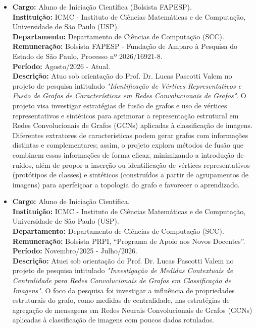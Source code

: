 \documentclass[a4paper,10pt]{article}
\begin{document}
\begin{itemize}

\item
\textbf{Cargo:} Aluno de Iniciação Científica (Bolsista FAPESP). \\
\textbf{Instituição:} ICMC - Instituto de Ciências Matemáticas e de Computação, Universidade de São Paulo (USP). \\
\textbf{Departamento:} Departamento de Ciências de Computação (SCC). \\
\textbf{Remuneração:} Bolsista FAPESP - Fundação de Amparo à Pesquisa do Estado de São Paulo, Processo nº 2026/16921-8. \\
\textbf{Período:} Agosto/2026 - Atual. \\
\textbf{Descrição:} Atuo sob orientação do Prof. Dr. Lucas Pascotti Valem no projeto de pesquisa intitulado \textit{"Identificação de Vértices Representativos e Fusão de Grafos de Características em Redes Convolucionais de Grafos"}. O projeto visa investigar estratégias de fusão de grafos e uso de vértices representativos e sintéticos para aprimorar a representação estrutural em Redes Convolucionais de Grafos (GCNs) aplicadas à classificação de imagens. Diferentes extratores de características podem gerar grafos com informações distintas e complementares; assim, o projeto explora métodos de fusão que combinem essas informações de forma eficaz, minimizando a introdução de ruídos, além de propor a inserção ou identificação de vértices representativos (protótipos de classes) e sintéticos (construídos a partir de agrupamentos de imagens) para aperfeiçoar a topologia do grafo e favorecer o aprendizado.

\item
\textbf{Cargo:} Aluno de Iniciação Científica. \\
\textbf{Instituição:} ICMC - Instituto de Ciências Matemáticas e de Computação, Universidade de São Paulo (USP). \\
\textbf{Departamento:} Departamento de Ciências de Computação (SCC). \\
\textbf{Remuneração:} Bolsista PRPI, “Programa de Apoio aos Novos Docentes”. \\
\textbf{Período:} Novembro/2025 - Julho/2026. \\
\textbf{Descrição:} Atuei sob orientação do Prof. Dr. Lucas Pascotti Valem no projeto de pesquisa intitulado \textit{"Investigação de Medidas Contextuais de Centralidade para Redes Convolucionais de Grafos em Classificação de Imagens"}. O foco da pesquisa foi investigar a influência de propriedades estruturais do grafo, como medidas de centralidade, nas estratégias de agregação de mensagens em Redes Neurais Convolucionais de Grafos (GCNs) aplicadas à classificação de imagens com poucos dados rotulados.


\end{itemize}
\end{document}
